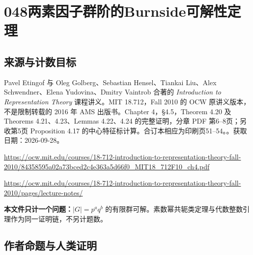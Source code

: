 \documentclass[UTF8,11pt]{ctexart}
\theoremstyle{definition}
\begin{document}
\section*{048\quad 两素因子群阶的Burnside可解性定理}
\subsection*{来源与计数目标}
Pavel Etingof 与 Oleg Golberg、Sebastian Hensel、Tiankai Liu、Alex Schwendner、Elena Yudovina、Dmitry Vaintrob 合著的 \emph{Introduction to Representation Theory} 课程讲义。MIT 18.712，Fall 2010 的 OCW 原讲义版本，不是限制转载的 2016 年 AMS 出版书。Chapter 4，\S4.5，Theorem 4.20 及 Theorems 4.21、4.23、Lemmas 4.22、4.24 的完整证明，分章 PDF 第6--8页；另收第5页 Proposition 4.17 的中心特征标计算。合订本相应为印刷页51--54。。获取日期：2026-09-28。
\par\url{https://ocw.mit.edu/courses/18-712-introduction-to-representation-theory-fall-2010/84358595a02a73bced2c4e363a5d66f0_MIT18_712F10_ch4.pdf}
\par\url{https://ocw.mit.edu/courses/18-712-introduction-to-representation-theory-fall-2010/pages/lecture-notes/}
\par\textbf{本文件只计一个问题：}$|G|=p^aq^b$ 的有限群可解。素数幂共轭类定理与代数整数引理作为同一证明链，不另计题数。
\subsection*{作者命题与人类证明}
\end{document}
